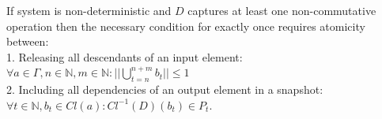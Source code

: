 \begin{theorem}
\label{necessary_conditions}
If system is non-deterministic and $D$ captures at least one non-commutative operation then the necessary condition for exactly once requires atomicity between:\\
1. Releasing all descendants of an input element:\\ $\forall a\in \Gamma, n \in {\mathbb{N}},m \in {\mathbb{N}}: ||\bigcup^{n+m}_{t=n}{}b_t|| \leq 1$\\
2. Including all dependencies of an output element in a snapshot:\\ $\forall t \in \mathbb{N}, b_t \in Cl(a): Cl^{-1}(D)(b_t) \in P_t$.
\end{theorem}
\begin{sketch}
$ $\newline
\end{sketch}



